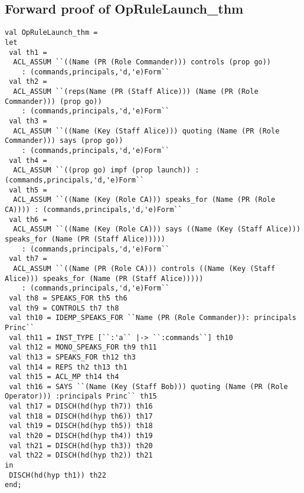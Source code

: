 \documentclass{report}
\begin{document}
\subsection{Forward proof of OpRuleLaunch_thm}
\label{proof-14-1}
\begin{lstlisting}[frame=TBlr]
val OpRuleLaunch_thm =
let
 val th1 = 
  ACL_ASSUM ``((Name (PR (Role Commander))) controls (prop go))
    : (commands,principals,'d,'e)Form``
 val th2 = 
  ACL_ASSUM ``(reps(Name (PR (Staff Alice))) (Name (PR (Role Commander))) (prop go))
    : (commands,principals,'d,'e)Form``
 val th3 = 
  ACL_ASSUM ``((Name (Key (Staff Alice))) quoting (Name (PR (Role Commander))) says (prop go))
    : (commands,principals,'d,'e)Form``
 val th4 = 
  ACL_ASSUM ``((prop go) impf (prop launch)) : (commands,principals,'d,'e)Form``
 val th5 = 
  ACL_ASSUM ``((Name (Key (Role CA))) speaks_for (Name (PR (Role CA)))) : (commands,principals,'d,'e)Form``
 val th6 = 
  ACL_ASSUM ``((Name (Key (Role CA))) says ((Name (Key (Staff Alice))) speaks_for (Name (PR (Staff Alice)))))
    : (commands,principals,'d,'e)Form``
 val th7 = 
  ACL_ASSUM ``((Name (PR (Role CA))) controls ((Name (Key (Staff Alice))) speaks_for (Name (PR (Staff Alice)))))
    : (commands,principals,'d,'e)Form``
 val th8 = SPEAKS_FOR th5 th6
 val th9 = CONTROLS th7 th8
 val th10 = IDEMP_SPEAKS_FOR ``Name (PR (Role Commander)): principals Princ``
 val th11 = INST_TYPE [``:'a`` |-> ``:commands``] th10
 val th12 = MONO_SPEAKS_FOR th9 th11
 val th13 = SPEAKS_FOR th12 th3
 val th14 = REPS th2 th13 th1
 val th15 = ACL_MP th14 th4
 val th16 = SAYS ``(Name (Key (Staff Bob))) quoting (Name (PR (Role Operator))) :principals Princ`` th15
 val th17 = DISCH(hd(hyp th7)) th16
 val th18 = DISCH(hd(hyp th6)) th17
 val th19 = DISCH(hd(hyp th5)) th18
 val th20 = DISCH(hd(hyp th4)) th19
 val th21 = DISCH(hd(hyp th3)) th20
 val th22 = DISCH(hd(hyp th2)) th21
in
 DISCH(hd(hyp th1)) th22
end;
\end{lstlisting}
\end{document}
